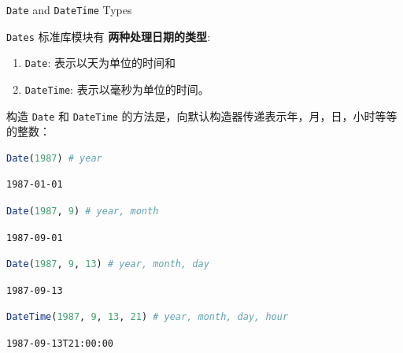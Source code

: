 \documentclass[
  notoc %
]{tufte-book}
\makeatletter
\providecommand{\tightlist}{%
  \setlength{\itemsep}{0pt}\setlength{\parskip}{0pt}
}
\newcommand{\passthrough}[1]{#1}
\renewcommand\subsubsection{%
\@startsection{subsubsection}{3}{\z@ }{-3.25ex\@plus -1ex \@minus -.2ex}{1.5ex \@plus .2ex}{\normalfont \normalsize \bfseries }
}
\makeatother
\begin{document}
\hypertarget{sec:dates_types}{%
\subsubsection{\texorpdfstring{\texttt{Date} and \texttt{DateTime}
Types}{Date and DateTime Types}}\label{sec:dates_types}}

\passthrough{\lstinline!Dates!} 标准库模块有
\textbf{两种处理日期的类型}:

\begin{enumerate}
\def\labelenumi{\arabic{enumi}.}
\tightlist
\item
  \passthrough{\lstinline!Date!}: 表示以天为单位的时间和
\item
  \passthrough{\lstinline!DateTime!}: 表示以毫秒为单位的时间。
\end{enumerate}

构造 \passthrough{\lstinline!Date!} 和
\passthrough{\lstinline!DateTime!}
的方法是，向默认构造器传递表示年，月，日，小时等等的整数：

\begin{lstlisting}[language=Julia]
Date(1987) # year
\end{lstlisting}

\begin{lstlisting}[language=Output]
1987-01-01
\end{lstlisting}

\begin{lstlisting}[language=Julia]
Date(1987, 9) # year, month
\end{lstlisting}

\begin{lstlisting}[language=Output]
1987-09-01
\end{lstlisting}

\begin{lstlisting}[language=Julia]
Date(1987, 9, 13) # year, month, day
\end{lstlisting}

\begin{lstlisting}[language=Output]
1987-09-13
\end{lstlisting}

\begin{lstlisting}[language=Julia]
DateTime(1987, 9, 13, 21) # year, month, day, hour
\end{lstlisting}

\begin{lstlisting}[language=Output]
1987-09-13T21:00:00
\end{lstlisting}
\end{document}
